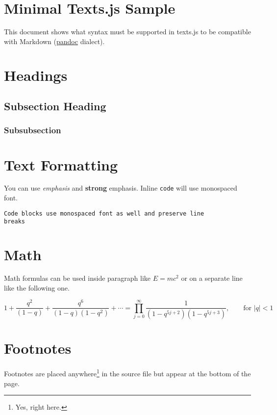 \documentclass[10pt]{article}
\begin{document}
\section{Minimal Texts.js Sample}

This document shows what syntax must be supported in texts.js to be compatible
with Markdown (\href{http://johnmacfarlane.net/pandoc/}{pandoc} dialect).

\section{Headings}

\subsection{Subsection Heading}

\subsubsection{Subsubsection}

\section{Text Formatting}

You can use \emph{emphasis} and \textbf{strong} emphasis. Inline \texttt{code}
will use monospaced font.

\begin{verbatim}
Code blocks use monospaced font as well and preserve line
breaks
\end{verbatim}

\section{Math}

Math formulas can be used inside paragraph like $E=mc^2$ or on a separate line
like the following one.

\begin{equation}
1+\frac{q^2}{(1-q)}+\frac{q^6}{(1-q)(1-q^2)}+\cdots =
\prod_{j=0}^{\infty}\frac{1}{(1-q^{5j+2})(1-q^{5j+3})},
\quad\quad \text{for $|q|<1$}
\end{equation}

\section{Footnotes}

Footnotes are placed anywhere\footnote{Yes, right here.} in the source file but
appear at the bottom of the page.
\end{document}

